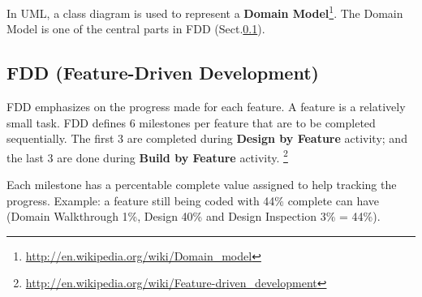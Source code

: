 In UML, a class diagram is used to represent a {\bf Domain
Model}\footnote{\url{http://en.wikipedia.org/wiki/Domain_model}}.
The Domain Model is one of the central parts in FDD (Sect.\ref{sec:FDD}).

\subsection{FDD (Feature-Driven Development)}
\label{sec:FDD}

FDD emphasizes on the progress made for each feature. A feature is a relatively
small task. FDD defines 6 milestones per feature that are to be completed
sequentially. The first 3 are completed during {\bf Design by Feature} activity;
and the last 3 are done during {\bf Build by Feature} activity.
\footnote{\url{http://en.wikipedia.org/wiki/Feature-driven_development}}

Each milestone has a percentable complete value assigned to help tracking the
progress. Example: a feature still being coded with 44\% complete can have
(Domain Walkthrough 1\%, Design 40\% and Design Inspection 3\% = 44\%).

